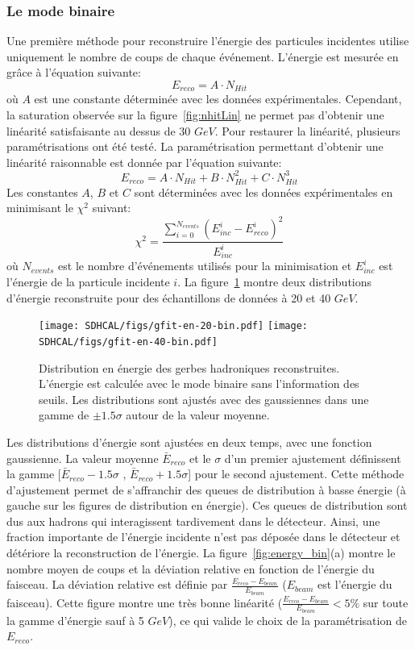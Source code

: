 \subsubsection{Le mode binaire}
Une première méthode pour reconstruire l'énergie des particules incidentes utilise uniquement le nombre de coups de chaque événement. L'énergie est mesurée en grâce à l'équation suivante:
\begin{equation}
  E_{reco} = A \cdot N_{Hit}
\end{equation}
où $A$ est une constante déterminée avec les données expérimentales. Cependant, la saturation observée sur la figure~\ref{fig:nhitLin} ne permet pas d'obtenir une linéarité satisfaisante au dessus de 30 $GeV$. Pour restaurer la linéarité, plusieurs paramétrisations ont été testé. La paramétrisation permettant d'obtenir une linéarité raisonnable est donnée par l'équation suivante:
\begin{equation}
  E_{reco} = A \cdot N_{Hit} + B \cdot N_{Hit}^2 + C \cdot N_{Hit}^3
\end{equation}
Les constantes $A$, $B$ et $C$ sont déterminées avec les données expérimentales en minimisant le $\chi^2$ suivant:
\begin{equation}
  \chi^2 = \frac{\sum_{i=0}^{N_{events}}(E_{inc}^i-E_{reco}^i)^2}{E_{inc}^i}
\end{equation}
où $N_{events}$ est le nombre d'événements utilisés pour la minimisation et $E_{inc}^i$ est l'énergie de la particule incidente $i$. La figure~\ref{fig:energy_dist_bin} montre deux distributions d'énergie reconstruite pour des échantillons de données à 20 et 40 $GeV$. 
\begin{figure}[!h]
  \begin{center}
    \texttt{[image: SDHCAL/figs/gfit-en-20-bin.pdf]}
    \texttt{[image: SDHCAL/figs/gfit-en-40-bin.pdf]}
    \caption{Distribution en énergie des gerbes hadroniques reconstruites. L'énergie est calculée avec le mode binaire sans l'information des seuils. Les distributions sont ajustés avec des gaussiennes dans une gamme de $\pm1.5\sigma$ autour de la valeur moyenne.}
    \label{fig:energy_dist_bin}
  \end{center}
\end{figure}
Les distributions d'énergie sont ajustées en deux temps, avec une fonction gaussienne. La valeur moyenne $\bar{E}_{reco}$ et le $\sigma$ d'un premier ajustement définissent la gamme [$\bar{E}_{reco}-1.5\sigma$ , $\bar{E}_{reco}+1.5\sigma$] pour le second ajustement. Cette méthode d'ajustement permet de s'affranchir des queues de distribution à basse énergie (à gauche sur les figures de distribution en énergie). Ces queues de distribution sont dus aux hadrons qui interagissent tardivement dans le détecteur. Ainsi, une fraction importante de l'énergie incidente n'est pas déposée dans le détecteur et détériore la reconstruction de l'énergie. La figure~\ref{fig:energy_bin}(a) montre le nombre moyen de coups et la déviation relative en fonction de l'énergie du faisceau. La déviation relative est définie par $\frac{E_{reco}-E_{beam}}{E_{beam}}$ ($E_{beam}$ est l'énergie du faisceau). Cette figure montre une très bonne linéarité ($\frac{E_{reco}-E_{beam}}{E_{beam}}<5\%$ sur toute la gamme d'énergie sauf à 5 $GeV$), ce qui valide le choix de la paramétrisation de $E_{reco}$.
